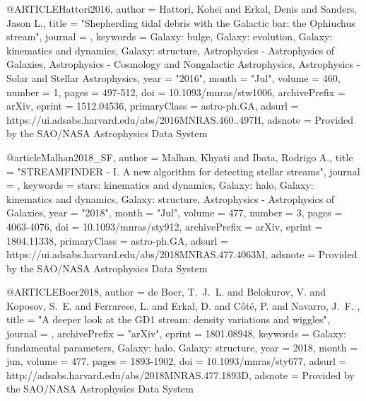 \documentclass[apj]{emulateapj}
\begin{document}
{{@ARTICLE{Hattori2016,
       author = {{Hattori}, Kohei and {Erkal}, Denis and {Sanders}, Jason L.},
        title = "{Shepherding tidal debris with the Galactic bar: the Ophiuchus stream}",
      journal = {\mnras},
     keywords = {Galaxy: bulge, Galaxy: evolution, Galaxy: kinematics and dynamics, Galaxy: structure, Astrophysics - Astrophysics of Galaxies, Astrophysics - Cosmology and Nongalactic Astrophysics, Astrophysics - Solar and Stellar Astrophysics},
         year = "2016",
        month = "Jul",
       volume = {460},
       number = {1},
        pages = {497-512},
          doi = {10.1093/mnras/stw1006},
archivePrefix = {arXiv},
       eprint = {1512.04536},
 primaryClass = {astro-ph.GA},
       adsurl = {https://ui.adsabs.harvard.edu/abs/2016MNRAS.460..497H},
      adsnote = {Provided by the SAO/NASA Astrophysics Data System}
}



@article{Malhan2018_SF,
       author = {{Malhan}, Khyati and {Ibata}, Rodrigo A.},
        title = "{STREAMFINDER - I. A new algorithm for detecting stellar streams}",
      journal = {\mnras},
     keywords = {stars: kinematics and dynamics, Galaxy: halo, Galaxy: kinematics and dynamics, Galaxy: structure, Astrophysics - Astrophysics of Galaxies},
         year = "2018",
        month = "Jul",
       volume = {477},
       number = {3},
        pages = {4063-4076},
          doi = {10.1093/mnras/sty912},
archivePrefix = {arXiv},
       eprint = {1804.11338},
 primaryClass = {astro-ph.GA},
       adsurl = {https://ui.adsabs.harvard.edu/abs/2018MNRAS.477.4063M},
      adsnote = {Provided by the SAO/NASA Astrophysics Data System}
}







@ARTICLE{Boer2018,
   author = {{de Boer}, T.~J.~L. and {Belokurov}, V. and {Koposov}, S.~E. and 
	{Ferrarese}, L. and {Erkal}, D. and {C{\^o}t{\'e}}, P. and {Navarro}, J.~F.
	},
    title = "{A deeper look at the GD1 stream: density variations and wiggles}",
  journal = {\mnras},
archivePrefix = "arXiv",
   eprint = {1801.08948},
 keywords = {Galaxy: fundamental parameters, Galaxy: halo, Galaxy: structure},
     year = 2018,
    month = jun,
   volume = 477,
    pages = {1893-1902},
      doi = {10.1093/mnras/sty677},
   adsurl = {http://adsabs.harvard.edu/abs/2018MNRAS.477.1893D},
  adsnote = {Provided by the SAO/NASA Astrophysics Data System}
}


}}
\end{document}
